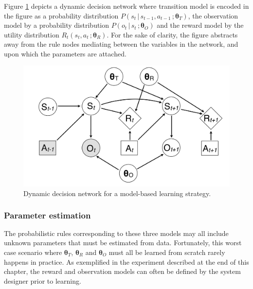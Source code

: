 Figure \ref{fig:modelbasediagram} depicts a dynamic decision network where transition model is encoded in the figure as a probability distribution $P(s_t \, | \, s_{t-1}, a_{t-1} \,; \boldsymbol\theta_T)$, the observation model by a probability distribution $P(o_t \, | \, s_t\,; \boldsymbol\theta_O)$ and the reward model by the utility distribution $R_t(s_t,a_t\,; \boldsymbol\theta_R)$. For the sake of clarity, the figure abstracts away from the rule nodes mediating between the variables in the network, and upon which the parameters are attached.

\begin{figure}[h]
\centering
\includegraphics[scale=0.25]{imgs/modelbaseddiagram.pdf}
\caption{Dynamic decision network for a model-based learning strategy.}
\label{fig:modelbasediagram}
\end{figure}

\subsubsection*{Parameter estimation}

The probabilistic rules corresponding to these three models may all include unknown parameters that must be estimated from data.  Fortunately, this worst case scenario where $\boldsymbol\theta_T$, $\boldsymbol\theta_R$ and $\boldsymbol\theta_O$ must all be learned from scratch rarely happens in practice. As exemplified in the experiment described at the end of this chapter, the reward and observation models can often be defined by the system designer prior to learning. 

